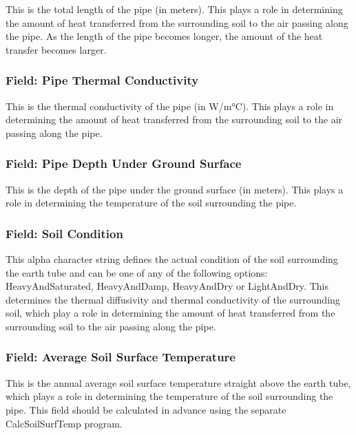 This is the total length of the pipe (in meters). This plays a role in determining the amount of heat transferred from the surrounding soil to the air passing along the pipe. As the length of the pipe becomes longer, the amount of the heat transfer becomes larger.

\subsubsection{Field: Pipe Thermal Conductivity}\label{field-pipe-thermal-conductivity}

This is the thermal conductivity of the pipe (in W/m°C). This plays a role in determining the amount of heat transferred from the surrounding soil to the air passing along the pipe.

\subsubsection{Field: Pipe Depth Under Ground Surface}\label{field-pipe-depth-under-ground-surface}

This is the depth of the pipe under the ground surface (in meters). This plays a role in determining the temperature of the soil surrounding the pipe.

\subsubsection{Field: Soil Condition}\label{field-soil-condition}

This alpha character string defines the actual condition of the soil surrounding the earth tube and can be one of any of the following options: HeavyAndSaturated, HeavyAndDamp, HeavyAndDry or LightAndDry. This determines the thermal diffusivity and thermal conductivity of the surrounding soil, which play a role in determining the amount of heat transferred from the surrounding soil to the air passing along the pipe.

\subsubsection{Field: Average Soil Surface Temperature}\label{field-average-soil-surface-temperature}

This is the annual average soil surface temperature straight above the earth tube, which plays a role in determining the temperature of the soil surrounding the pipe. This field should be calculated in advance using the separate CalcSoilSurfTemp program.

